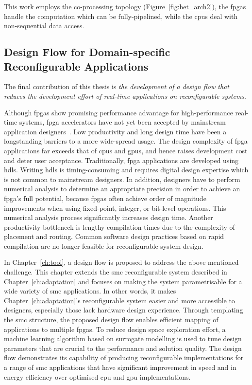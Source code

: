This work employs the co-processing topology (Figure~\ref{fig:het_arch2}), the \glspl{fpga} handle the computation which can be fully-pipelined, while the \glspl{cpu} deal with non-sequential data access.

\subsection{Design Flow for Domain-specific Reconfigurable Applications}

The final contribution of this thesis is \textit{the development of a design flow that reduces the development effort of real-time applications on reconfigurable systems}.

Although \glspl{fpga} show promising performance advantage for high-performance real-time systems, \gls{fpga} accelerators have not yet been accepted by mainstream application designers~\cite{stitt11}.
Low productivity and long design time have been a longstanding barriers to a more wide-spread usage.
The design complexity of \gls{fpga} applications far exceeds that of \glspl{cpu} and \glspl{gpu}, and hence raises development cost and deter user acceptance.
Traditionally, \gls{fpga} applications are developed using \glspl{hdl}.
Writing \glspl{hdl} is timing-consuming and requires digital design expertise which is not common to mainstream designers.
In addition, designers have to perform numerical analysis to determine an appropriate precision in order to achieve an \gls{fpga}'s full potential, because \glspl{fpga} often achieve order of magnitude improvements when using fixed-point, integer, or bit-level operations.
This numerical analysis process significantly increases design time.
Another productivity bottleneck is lengthy compilation times due to the complexity of placement and routing.
Common software design practices based on rapid compilation are no longer feasible for reconfigurable system design.

In Chapter~\ref{ch:tool}, a design flow is proposed to address the above mentioned challenge.
This chapter extends the \gls{smc} reconfigurable system described in Chapter~\ref{ch:adaptation} and focuses on making the system parametrisable for a wide variety of \gls{smc} applications.
In other words, it makes Chapter~\ref{ch:adaptation}'s reconfigurable system easier and more accessible to designers, especially those lack hardware design experience.
Through templating the \gls{smc} structure, the proposed design flow enables efficient mapping of applications to multiple \glspl{fpga}.
To reduce design space exploration effort, a machine learning algorithm based on surrogate modelling is used to tune design parameters that are crucial to the performance and solution quality.
The design flow demonstrates its capability of producing reconfigurable implementations for a range of \gls{smc} applications that have significant improvement in speed and in energy efficiency over optimised \gls{cpu} and \gls{gpu} implementations.


